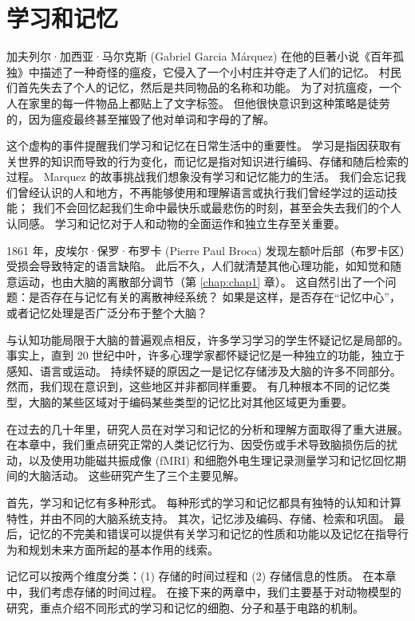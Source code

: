 \chapter{学习和记忆} \label{chap:chap52}

加夫列尔·加西亚·马尔克斯 (Gabriel Garcia Márquez) 在他的巨著小说《百年孤独》中描述了一种奇怪的瘟疫，它侵入了一个小村庄并夺走了人们的记忆。 村民们首先失去了个人的记忆，然后是共同物品的名称和功能。 为了对抗瘟疫，一个人在家里的每一件物品上都贴上了文字标签。 但他很快意识到这种策略是徒劳的，因为瘟疫最终甚至摧毁了他对单词和字母的了解。

这个虚构的事件提醒我们学习和记忆在日常生活中的重要性。 学习是指因获取有关世界的知识而导致的行为变化，而记忆是指对知识进行编码、存储和随后检索的过程。 Marquez 的故事挑战我们想象没有学习和记忆能力的生活。 我们会忘记我们曾经认识的人和地方，不再能够使用和理解语言或执行我们曾经学过的运动技能； 我们不会回忆起我们生命中最快乐或最悲伤的时刻，甚至会失去我们的个人认同感。 学习和记忆对于人和动物的全面运作和独立生存至关重要。

1861 年，皮埃尔·保罗·布罗卡 (Pierre Paul Broca) 发现左额叶后部（布罗卡区）受损会导致特定的语言缺陷。 此后不久，人们就清楚其他心理功能，如知觉和随意运动，也由大脑的离散部分调节（第 \ref{chap:chap1} 章）。 这自然引出了一个问题：是否存在与记忆有关的离散神经系统？ 如果是这样，是否存在“记忆中心”，或者记忆处理是否广泛分布于整个大脑？

与认知功能局限于大脑的普遍观点相反，许多学习学习的学生怀疑记忆是局部的。 事实上，直到 20 世纪中叶，许多心理学家都怀疑记忆是一种独立的功能，独立于感知、语言或运动。 持续怀疑的原因之一是记忆存储涉及大脑的许多不同部分。 然而，我们现在意识到，这些地区并非都同样重要。 有几种根本不同的记忆类型，大脑的某些区域对于编码某些类型的记忆比对其他区域更为重要。

在过去的几十年里，研究人员在对学习和记忆的分析和理解方面取得了重大进展。 在本章中，我们重点研究正常的人类记忆行为、因受伤或手术导致脑损伤后的扰动，以及使用功能磁共振成像 (fMRI) 和细胞外电生理记录测量学习和记忆回忆期间的大脑活动。 这些研究产生了三个主要见解。

首先，学习和记忆有多种形式。 每种形式的学习和记忆都具有独特的认知和计算特性，并由不同的大脑系统支持。 其次，记忆涉及编码、存储、检索和巩固。 最后，记忆的不完美和错误可以提供有关学习和记忆的性质和功能以及记忆在指导行为和规划未来方面所起的基本作用的线索。

记忆可以按两个维度分类：(1) 存储的时间过程和 (2) 存储信息的性质。 在本章中，我们考虑存储的时间过程。 在接下来的两章中，我们主要基于对动物模型的研究，重点介绍不同形式的学习和记忆的细胞、分子和基于电路的机制。

